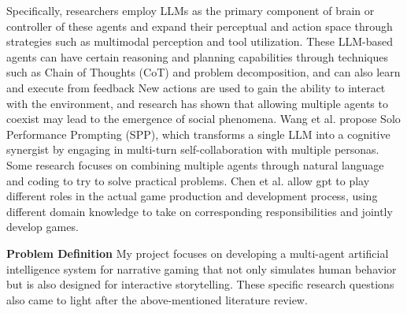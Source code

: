 Specifically, researchers employ LLMs as the primary component of brain or controller of these agents and expand their perceptual and action space through strategies such as multimodal perception and tool utilization\cite{yao2022react}.
These LLM-based agents can have certain reasoning and planning capabilities through techniques such as Chain of Thoughts (CoT) and problem decomposition, and can also learn and execute from feedback New actions are used to gain the ability to interact with the environment, and research has shown that allowing multiple agents to coexist may lead to the emergence of social phenomena\cite{park2023generative}.
Wang et al.\cite{wang_unleashing_2023} propose Solo Performance Prompting (SPP), which transforms a single LLM into a cognitive synergist by engaging in multi-turn self-collaboration with multiple personas.
Some research focuses on combining multiple agents through natural language and coding to try to solve practical problems\cite{chen_agentverse_2023, wu_autogen_2023}.
Chen et al.\cite{chen_gamegpt_2023} allow gpt to play different roles in the actual game production and development process, using different domain knowledge to take on corresponding responsibilities and jointly develop games.

\textbf{Problem Deﬁnition}\quad
My project focuses on developing a multi-agent artificial intelligence system for narrative gaming that not only simulates human behavior but is also designed for interactive storytelling. 
These specific research questions also came to light after the above-mentioned literature review.


